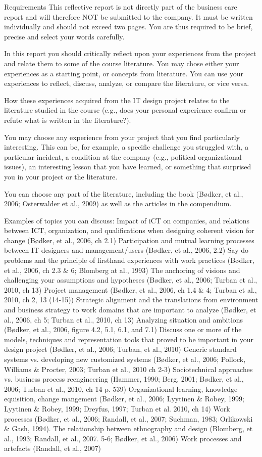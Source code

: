 Requirements 
This reflective report is not directly part of the business care report and will therefore NOT be submitted to the company. It must be written individually and should not exceed two pages. You are thus required to be brief, precise and select your words carefully.

In this report you should critically reflect upon your experiences from the project and relate them to some of the course literature. You may chose either your experiences as a starting point, or concepts from literature. You can use your experiences to reflect, discuss, analyze, or compare the literature, or vice versa.

How these experiences acquired from the IT design project relates to the literature studied in the course (e.g., does your personal experience confirm or refute what is written in the literature?).

You may choose any experience from your project that you find particularly interesting. This can be, for example, a specific challenge you struggled with, a particular incident, a condition at the company (e.g., political organizational issues), an interesting lesson that you have learned, or something that surprised you in your project or the literature.

You can choose any part of the literature, including the book (Bødker, et al., 2006; Osterwalder et al., 2009) as well as the articles in the compendium.

Examples of topics you can discuss:
Impact of iCT on companies, and relations between ICT, organization, and qualifications when designing coherent vision for change (Bødker,  et al., 2006, ch 2.1)
Participation and mutual learning processes between IT designers and management/users (Bødker,  et al., 2006, 2.2)
Say-do problems and the principle of firsthand experiences with work practices (Bødker,  et al., 2006, ch 2.3 \& 6; Blomberg at al., 1993)
The anchoring of visions and challenging your assumptions and hypotheses (Bødker,  et al., 2006; Turban et al., 2010, ch 13)
Project management (Bødker,  et al., 2006, ch 1.4 \& 4; Turban et al., 2010, ch 2, 13 (14-15))
Strategic alignment and the translations from environment and business strategy to work domains that are important to analyze (Bødker,  et al., 2006, ch 5; Turban et al., 2010, ch 13)
Analyzing situation and ambitions (Bødker,  et al., 2006, figure 4.2, 5.1, 6.1, and 7.1)
Discuss one or more of the models, techniques and representation tools that proved to be important in your design project (Bødker,  et al., 2006; Turban, et al., 2010)
Generic standard systems vs. developing new customized systems (Bødker, et al., 2006; Pollock, Williams \& Procter, 2003; Turban et al., 2010 ch 2-3)
Sociotechnical approaches vs. business process reengineering (Hammer, 1990; Berg, 2001; Bødker, et al., 2006; Turban et al., 2010, ch 14 p. 539)
Organizational learning, knowledge equisition, change mangement (Bødker,  et al., 2006; Lyytinen \& Robey, 1999; Lyytinen \& Robey, 1999; Dreyfus, 1997; Turban et al. 2010, ch 14)
Work processes (Bødker,  et al., 2006; Randall, et al., 2007; Suchman, 1983; Orlikowski \& Gash, 1994).
The relationship between ethnography and design (Blomberg, et al., 1993; Randall, et al., 2007. 5-6; Bødker, et al., 2006)
Work processes and artefacts (Randall, et al., 2007)